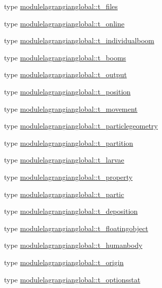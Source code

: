 \begin{DoxyCompactItemize}
\item 
type \mbox{\hyperlink{structmodulelagrangianglobal_1_1t__files}{modulelagrangianglobal\+::t\+\_\+files}}
\item 
type \mbox{\hyperlink{structmodulelagrangianglobal_1_1t__online}{modulelagrangianglobal\+::t\+\_\+online}}
\item 
type \mbox{\hyperlink{structmodulelagrangianglobal_1_1t__individualboom}{modulelagrangianglobal\+::t\+\_\+individualboom}}
\item 
type \mbox{\hyperlink{structmodulelagrangianglobal_1_1t__booms}{modulelagrangianglobal\+::t\+\_\+booms}}
\item 
type \mbox{\hyperlink{structmodulelagrangianglobal_1_1t__output}{modulelagrangianglobal\+::t\+\_\+output}}
\item 
type \mbox{\hyperlink{structmodulelagrangianglobal_1_1t__position}{modulelagrangianglobal\+::t\+\_\+position}}
\item 
type \mbox{\hyperlink{structmodulelagrangianglobal_1_1t__movement}{modulelagrangianglobal\+::t\+\_\+movement}}
\item 
type \mbox{\hyperlink{structmodulelagrangianglobal_1_1t__particlegeometry}{modulelagrangianglobal\+::t\+\_\+particlegeometry}}
\item 
type \mbox{\hyperlink{structmodulelagrangianglobal_1_1t__partition}{modulelagrangianglobal\+::t\+\_\+partition}}
\item 
type \mbox{\hyperlink{structmodulelagrangianglobal_1_1t__larvae}{modulelagrangianglobal\+::t\+\_\+larvae}}
\item 
type \mbox{\hyperlink{structmodulelagrangianglobal_1_1t__property}{modulelagrangianglobal\+::t\+\_\+property}}
\item 
type \mbox{\hyperlink{structmodulelagrangianglobal_1_1t__partic}{modulelagrangianglobal\+::t\+\_\+partic}}
\item 
type \mbox{\hyperlink{structmodulelagrangianglobal_1_1t__deposition}{modulelagrangianglobal\+::t\+\_\+deposition}}
\item 
type \mbox{\hyperlink{structmodulelagrangianglobal_1_1t__floatingobject}{modulelagrangianglobal\+::t\+\_\+floatingobject}}
\item 
type \mbox{\hyperlink{structmodulelagrangianglobal_1_1t__humanbody}{modulelagrangianglobal\+::t\+\_\+humanbody}}
\item 
type \mbox{\hyperlink{structmodulelagrangianglobal_1_1t__origin}{modulelagrangianglobal\+::t\+\_\+origin}}
\item 
type \mbox{\hyperlink{structmodulelagrangianglobal_1_1t__optionsstat}{modulelagrangianglobal\+::t\+\_\+optionsstat}}

\end{DoxyCompactItemize}
